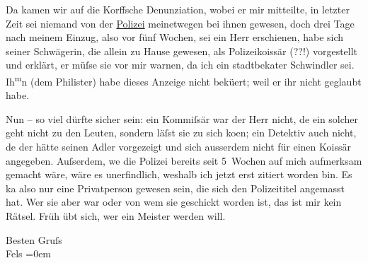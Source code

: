 \pstart
           Da{\geminationn} kamen wir auf die Korffsche Denunziation, wobei er mir mitteilte, in letzter Zeit
               sei niemand von der \uline{Polizei} meinetwegen bei ihnen
               gewesen, doch drei Tage nach meinem Einzug, also vor fünf Wochen, sei ein Herr
               erschienen, habe sich seiner Schwägerin, die allein zu Hause gewesen, als Polizeiko{\geminationm}issär (??!) vorgestellt und erklärt, er müſse sie vor
               mir warnen, da ich ein stadtbeka{\geminationn}ter Schwindler sei. Ih\substVorne{}\textsuperscript{m}\substDazwischen{}n\substHinten{} (dem Philister)
               habe dieses Anzeige nicht bekü{\geminationm}ert; weil er ihr nicht
               geglaubt habe.\pend
           
\pstart
           Nun – so viel dürfte sicher sein: ein Kommiſsär war der Herr nicht, de{\geminationn} ein solcher geht nicht zu den Leuten, sondern läſst
               sie zu sich ko{\geminationm}en; ein Detektiv auch nicht, de{\geminationn} der {\pb}hätte seinen Adler
               vorgezeigt und sich ausserdem nicht für einen Ko{\geminationm}issär
               angegeben. Auſserdem, we{\geminationn} die Polizei bereits seit
               5 Wochen auf mich aufmerksam gemacht wäre, wäre es unerfindlich, weshalb ich jetzt
               erst zitiert worden bin. Es ka{\geminationn} also nur eine
               Privatperson gewesen sein, die sich den Polizeititel angemasst hat. Wer sie aber war
               oder von wem sie geschickt worden ist, das ist mir kein Rätsel. Früh übt sich, wer
               ein Meister werden will.\pend
           
\pstart
           Besten Gruſs{\\[\baselineskip]}\spacefill\mbox{Fels}\pend
           \leftskip=0em{}\endnumbering{}  \newcommand{\dateiname}{L00401}\newcommand{\titel}{Friedrich M. Fels an Arthur Schnitzler, [12. 11. 1894]}\newcommand{\editorInnen}{Martin Anton Müller und Gerd-Hermann Susen}
